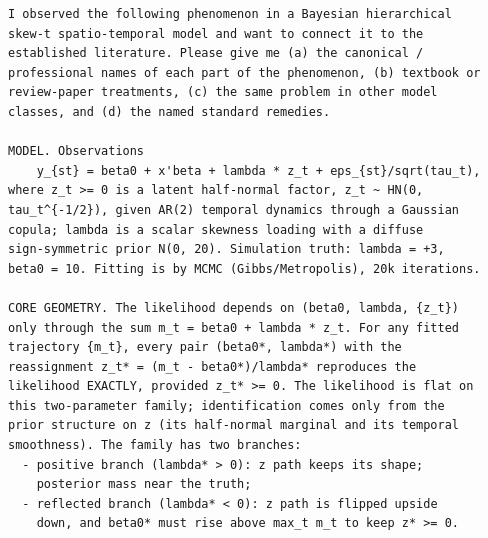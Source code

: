 \documentclass[11pt]{article}
\begin{document}
{\small
\begin{verbatim}
I observed the following phenomenon in a Bayesian hierarchical
skew-t spatio-temporal model and want to connect it to the
established literature. Please give me (a) the canonical /
professional names of each part of the phenomenon, (b) textbook or
review-paper treatments, (c) the same problem in other model
classes, and (d) the named standard remedies.

MODEL. Observations
    y_{st} = beta0 + x'beta + lambda * z_t + eps_{st}/sqrt(tau_t),
where z_t >= 0 is a latent half-normal factor, z_t ~ HN(0,
tau_t^{-1/2}), given AR(2) temporal dynamics through a Gaussian
copula; lambda is a scalar skewness loading with a diffuse
sign-symmetric prior N(0, 20). Simulation truth: lambda = +3,
beta0 = 10. Fitting is by MCMC (Gibbs/Metropolis), 20k iterations.

CORE GEOMETRY. The likelihood depends on (beta0, lambda, {z_t})
only through the sum m_t = beta0 + lambda * z_t. For any fitted
trajectory {m_t}, every pair (beta0*, lambda*) with the
reassignment z_t* = (m_t - beta0*)/lambda* reproduces the
likelihood EXACTLY, provided z_t* >= 0. The likelihood is flat on
this two-parameter family; identification comes only from the
prior structure on z (its half-normal marginal and its temporal
smoothness). The family has two branches:
  - positive branch (lambda* > 0): z path keeps its shape;
    posterior mass near the truth;
  - reflected branch (lambda* < 0): z path is flipped upside
    down, and beta0* must rise above max_t m_t to keep z* >= 0.


\end{verbatim}}
\end{document}
